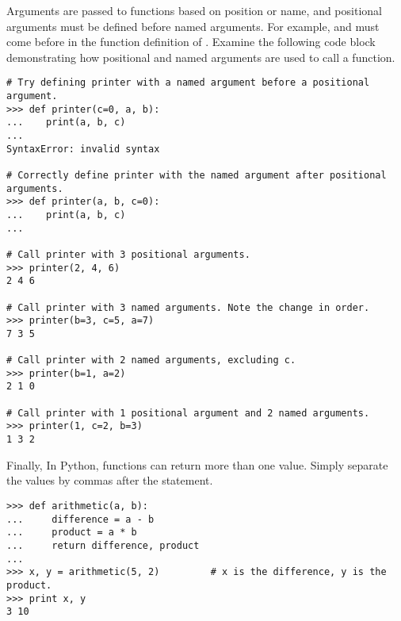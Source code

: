 Arguments are passed to functions based on position or name, and positional arguments must be defined before named arguments.
For example,  and  must come before  in the function definition of .
Examine the following code block demonstrating how positional and named arguments are used to call a function.
\begin{lstlisting}
# Try defining printer with a named argument before a positional argument.
>>> def printer(c=0, a, b):
...    print(a, b, c)
...
SyntaxError: invalid syntax

# Correctly define printer with the named argument after positional arguments.
>>> def printer(a, b, c=0):
...    print(a, b, c)
...

# Call printer with 3 positional arguments.
>>> printer(2, 4, 6)
2 4 6

# Call printer with 3 named arguments. Note the change in order.
>>> printer(b=3, c=5, a=7)
7 3 5

# Call printer with 2 named arguments, excluding c.
>>> printer(b=1, a=2)
2 1 0

# Call printer with 1 positional argument and 2 named arguments.
>>> printer(1, c=2, b=3)
1 3 2
\end{lstlisting}

Finally, In Python, functions can return more than one value.
Simply separate the values by commas after the  statement.

\begin{lstlisting}
>>> def arithmetic(a, b):
...     difference = a - b
...     product = a * b
...     return difference, product
...
>>> x, y = arithmetic(5, 2)         # x is the difference, y is the product.
>>> print x, y
3 10
\end{lstlisting}

